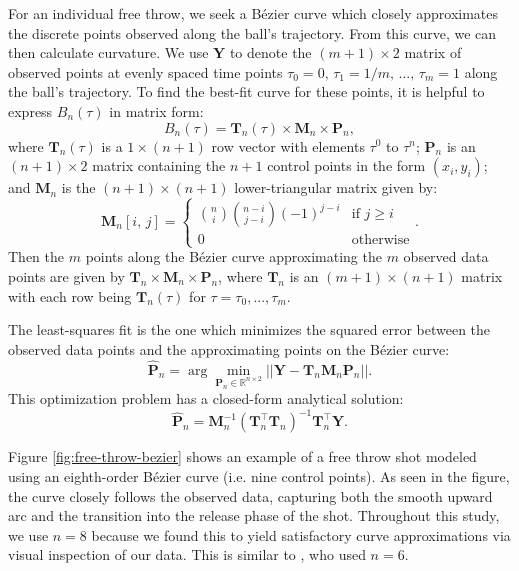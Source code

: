 \documentclass{article}
\begin{document}
            For an individual free throw, we seek a Bézier curve which closely approximates the discrete points observed along the ball's trajectory. From this curve, we can then calculate curvature. We use \(\mathbf{Y}\) to denote the \( (m + 1) \times 2\) matrix of observed points at evenly spaced time points $\tau_0 = 0,\, \tau_1 = 1 / m,\, ...,\, \tau_m = 1$ along the ball's trajectory. To find the best-fit curve for these points, it is helpful to express \(B_n(\tau)\) in matrix form:
            \[
              B_n(\tau) = \mathbf{T}_n(\tau) \times \mathbf{M}_n \times \mathbf{P}_n,
            \]
            where \( \mathbf{T}_n(\tau) \) is a \( 1 \times (n+1) \) row vector with elements \( \tau^0 \) to \( \tau^n \); \( \mathbf{P}_n \) is an \( (n+1) \times 2 \) matrix containing the \( n+1 \) control points in the form \( (x_i, y_i) \); and \( \mathbf{M}_n \) is the \( (n+1) \times (n+1) \) lower-triangular matrix given by:
            \[
              \mathbf{M}_n[i,\, j] = \begin{cases}
                  \binom{n}{i} \binom{n - i} {j - i} (-1)^{j - i} & \mbox{if } j \ge i\\
                  0 & \mbox{otherwise}
              \end{cases}.
            \]
            Then the $m$ points along the Bézier curve approximating the $m$ observed data points are given by $\mathbf{T}_n \times \mathbf{M}_n \times \mathbf{P}_n$, where \( \mathbf{T}_n \) is an \( (m + 1) \times (n+1) \) matrix with each row being \( \mathbf{T}_n(\tau) \) for $\tau = \tau_0, ..., \tau_m$.

            The least-squares fit is the one which minimizes the squared error between the observed data points and the approximating points on the Bézier curve:
            \[
              \hat{\mathbf{P}}_n = \arg\min_{\mathbf{P}_n \in \mathbb{R}^{n \times 2}} ||\mathbf{Y} - \mathbf{T}_n \mathbf{M}_n \mathbf{P}_n||.
            \]
            This optimization problem has a closed-form analytical solution:
            \[
              \hat{\mathbf{P}}_n = \mathbf{M}_n^{-1} (\mathbf{T}_n^\top \mathbf{T}_n)^{-1} \mathbf{T}_n^\top \mathbf{Y}.
            \]
            
            Figure \ref{fig:free-throw-bezier} shows an example of a free throw shot modeled using an eighth-order Bézier curve (i.e. nine control points). As seen in the figure, the curve closely follows the observed data, capturing both the smooth upward arc and the transition into the release phase of the shot. Throughout this study, we use $n = 8$ because we found this to yield satisfactory curve approximations via visual inspection of our data. This is similar to \citet{slegers_role_2024}, who used $n = 6$.
            
\end{document}

